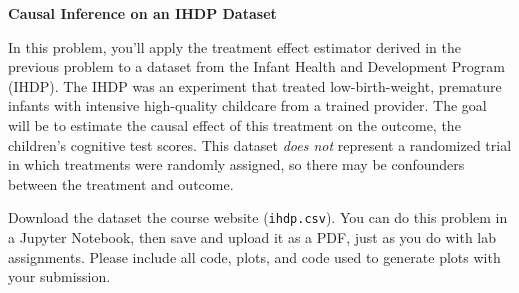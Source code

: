 \documentclass[12pt, addpoints]{exam}
\begin{document}
\begin{questions}


\question[25] \textbf{Causal Inference on an IHDP Dataset}

In this problem, you'll apply the treatment effect estimator derived in the previous problem to a dataset from the Infant Health and Development Program (IHDP). The IHDP was an experiment that treated low-birth-weight, premature infants with intensive high-quality childcare from a trained provider. The goal will be to estimate the causal effect of this treatment on the outcome, the children's cognitive test scores. This dataset \textit{does not} represent a randomized trial in which treatments were randomly assigned, so there may be confounders between the treatment and outcome.

Download the dataset the course website (\texttt{ihdp.csv}). You can do this problem in a Jupyter Notebook, then save and upload it as a PDF, just as you do with lab assignments. Please include all code, plots, and code used to generate plots with your submission.

\end{questions}
\end{document}

